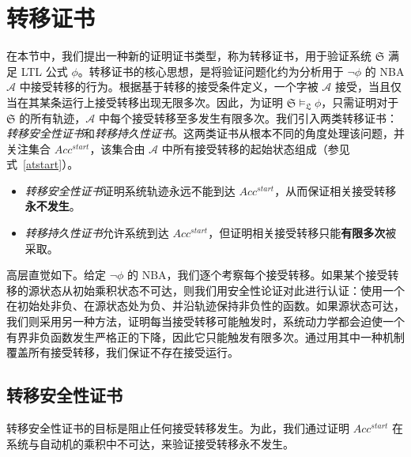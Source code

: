 ﻿\section{转移证书}
\label{sec:method}
在本节中，我们提出一种新的证明证书类型，称为转移证书，用于验证系统 $\mathfrak{S}$ 满足 LTL 公式 $\phi$。转移证书的核心思想，是将验证问题化约为分析用于 $\neg\phi$ 的 NBA $\mathcal{A}$ 中接受转移的行为。根据基于转移的接受条件定义，一个字被 $\mathcal{A}$ 接受，当且仅当在其某条运行上接受转移出现无限多次。因此，为证明 $\mathfrak{S} \models_{\mathfrak{L}} \phi$，只需证明对于 $\mathfrak{S}$ 的所有轨迹，$\mathcal{A}$ 中每个接受转移至多发生有限多次。我们引入两类转移证书：\emph{转移安全性证书}和\emph{转移持久性证书}。这两类证书从根本不同的角度处理该问题，并关注集合 $Acc^{start}$，该集合由 $\mathcal{A}$ 中所有接受转移的起始状态组成（参见式~\ref{atstart}）。

\begin{itemize}
    \item \emph{转移安全性证书}证明系统轨迹永远不能到达 $Acc^{start}$，从而保证相关接受转移\textbf{永不发生}。
    \item \emph{转移持久性证书}允许系统到达 $Acc^{start}$，但证明相关接受转移只能\textbf{有限多次}被采取。
\end{itemize}

高层直觉如下。给定 $\neg\phi$ 的 NBA，我们逐个考察每个接受转移。如果某个接受转移的源状态从初始乘积状态不可达，则我们用安全性论证对此进行认证：使用一个在初始处非负、在源状态处为负、并沿轨迹保持非负性的函数。如果源状态可达，我们则采用另一种方法，证明每当接受转移可能触发时，系统动力学都会迫使一个有界非负函数发生严格正的下降，因此它只能触发有限多次。通过用其中一种机制覆盖所有接受转移，我们保证不存在接受运行。

\subsection{转移安全性证书}

转移安全性证书的目标是阻止任何接受转移发生。为此，我们通过证明 $Acc^{start}$ 在系统与自动机的乘积中不可达，来验证接受转移永不发生。

